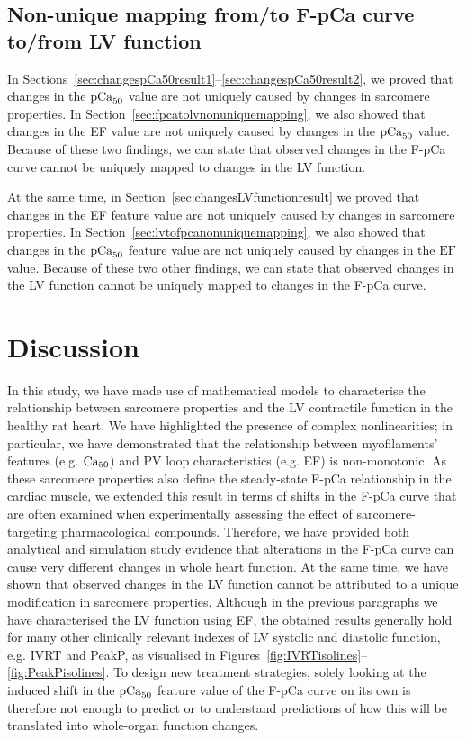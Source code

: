 %
%
%
\subsection{Non-unique mapping from/to F-pCa curve to/from LV function}\label{sec:ch8nonuniquemappings}
In Sections~\ref{sec:changespCa50result1}--\ref{sec:changespCa50result2}, we proved that changes in the $\textrm{pCa}_{50}$ value are not uniquely caused by changes in sarcomere properties. In Section~\ref{sec:fpcatolvnonuniquemapping}, we also showed that changes in the EF value are not uniquely caused by changes in the $\textrm{pCa}_{50}$ value. Because of these two findings, we can state that observed changes in the F-pCa curve cannot be uniquely mapped to changes in the LV function.

\vspace{0.2cm}
At the same time, in Section~\ref{sec:changesLVfunctionresult} we proved that changes in the EF feature value are not uniquely caused by changes in sarcomere properties. In Section~\ref{sec:lvtofpcanonuniquemapping}, we also showed that changes in the $\textrm{pCa}_{50}$ feature value are not uniquely caused by changes in the $\textrm{EF}$ value. Because of these two other findings, we can state that observed changes in the LV function cannot be uniquely mapped to changes in the F-pCa curve.


%
%
%
\section{Discussion}\label{sec:ch8discussion}
In this study, we have made use of mathematical models to characterise the relationship between sarcomere properties and the LV contractile function in the healthy rat heart. We have highlighted the presence of complex nonlinearities; in particular, we have demonstrated that the relationship between myofilaments' features (e.g. $\textrm{Ca}_{50}$) and PV loop characteristics (e.g. EF) is non-monotonic. As these sarcomere properties also define the steady-state F-pCa relationship in the cardiac muscle, we extended this result in terms of shifts in the F-pCa curve that are often examined when experimentally assessing the effect of sarcomere-targeting pharmacological compounds. Therefore, we have provided both analytical and simulation study evidence that alterations in the F-pCa curve can cause very different changes in whole heart function. At the same time, we have shown that observed changes in the LV function cannot be attributed to a unique modification in sarcomere properties. Although in the previous paragraphs we have characterised the LV function using EF, the obtained results generally hold for many other clinically relevant indexes of LV systolic and diastolic function, e.g. IVRT and PeakP, as visualised in Figures~\ref{fig:IVRTisolines}--\ref{fig:PeakPisolines}. To design new treatment strategies, solely looking at the induced shift in the $\textrm{pCa}_{50}$ feature value of the F-pCa curve on its own is therefore not enough to predict or to understand predictions of how this will be translated into whole-organ function changes.

